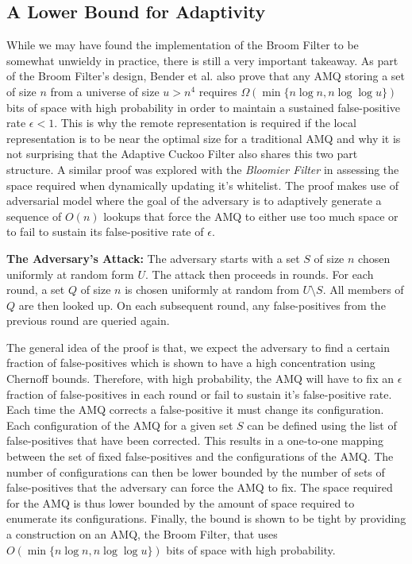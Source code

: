 \documentclass[../paper.tex]{subfiles}
\begin{document}
\subsection{A Lower Bound for Adaptivity} While we may have found the
implementation of the Broom Filter to be somewhat unwieldy in practice, there
is still a very important takeaway.  As part of the Broom Filter's design,
Bender et al. also prove that any AMQ storing a set of size $n$ from a universe
of size $u > n^4$ requires $\Omega (\min \{n\log n, n\log\log u\})$ bits of
space with high probability in order to maintain a sustained false-positive
rate $\epsilon < 1$.  This is why the remote representation is required if the
local representation is to be near the optimal size for a traditional AMQ and
why it is not surprising that the Adaptive Cuckoo Filter also shares this two
part structure.  A similar proof was explored with the {\it Bloomier Filter} 
\cite{bloomier-filter} in assessing the space required when dynamically 
updating it's whitelist. The proof makes use of adversarial model where the 
goal of the adversary is to adaptively generate a sequence of $O(n)$ lookups 
that force the AMQ to either use too much space or to fail to sustain its 
false-positive rate of $\epsilon$.  
	
	{\bf The Adversary's Attack:} The adversary starts with a set $S$ of size $n$ chosen
	uniformly at random form $U$.  The attack then proceeds in rounds.  For each round, 
	a set $Q$ of size $n$ is chosen uniformly at random from $U\setminus S$.  All members
	of $Q$ are then looked up. On each subsequent round, any false-positives from the 
	previous round are queried again. 
	
	The general idea of the proof is that, we expect the adversary to find a certain 
	fraction of false-positives which is shown to have a high concentration using Chernoff
	bounds.  Therefore, with high probability, the AMQ will have to fix an $\epsilon$ fraction
	of false-positives in each round or fail to sustain it's false-positive rate.  Each time the 
	AMQ corrects a false-positive it must change its configuration.  Each configuration of the 
	AMQ for a given set $S$ can be defined using the list of false-positives that have been
	corrected.  This results in a one-to-one mapping between the set of fixed false-positives 
	and the configurations of the AMQ.  The number of configurations can then be lower 
	bounded by the number of sets of false-positives that the adversary can force the AMQ
	to fix.  The space required for the AMQ is thus lower bounded by the amount of space 
	required to enumerate its configurations.  Finally, the bound is shown to be tight by 
	providing a construction on an AMQ, the Broom Filter, that uses $O(\min \{n\log n, 
	n\log\log u\})$ bits of space with high probability. 
	
	
\end{document}
